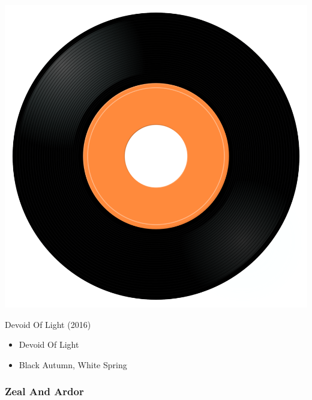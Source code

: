 \begin{minipage}[t]{0.25\textwidth}
\captionsetup{type=figure}
\includegraphics[width=\textwidth]{Images/cover.png}
\caption*{Devoid Of Light (2016)}
\end{minipage}
\begin{minipage}[t]{0.25\textwidth}\vspace{0pt}
\begin{itemize}[nosep,leftmargin=1em,labelwidth=*,align=left]
	\setlength{\itemsep}{0pt}
	\item Devoid Of Light
	\item Black Autumn, White Spring
\end{itemize}
\end{minipage}

\subsubsection{Zeal And Ardor}

